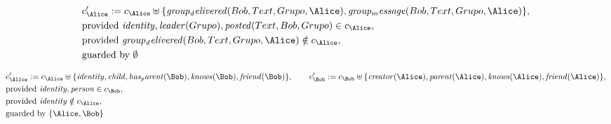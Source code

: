 \begin{align*}
&
c'_
{
\Alice
}
 := 
c_
{
\Alice
}
 \uplus 
\{
\mathit{
group_delivered
}
(
Bob
,
Text
,
Grupo
,
\Alice
)
,
\mathit{
group_message
}
(
Bob
,
Text
,
Grupo
,
\Alice
)
\}
,\\
&
\text{provided } 
\mathit{
identity
}
,
\mathit{
leader
}
(
Grupo
)
,
\mathit{
posted
}
(
Text
,
Bob
,
Grupo
)
 \in c_
{
\Alice
}
,\\
&
\text{provided } 
\mathit{
group_delivered
}
(
Bob
,
Text
,
Grupo
,
\Alice
)
 \notin c_
{
\Alice
}
,\\
&
\text{guarded by } \emptyset
\end{align*}

\begin{align*}
&
c'_
{
\Alice
}
 := 
c_
{
\Alice
}
 \uplus 
\{
\mathit{
identity
}
,
\mathit{
child
}
,
\mathit{
has_parent
}
(
\Bob
)
,
\mathit{
knows
}
(
\Bob
)
,
\mathit{
friend
}
(
\Bob
)
\}
, \qquad 
c'_
{
\Bob
}
 := 
c_
{
\Bob
}
 \uplus 
\{
\mathit{
creator
}
(
\Alice
)
,
\mathit{
parent
}
(
\Alice
)
,
\mathit{
knows
}
(
\Alice
)
,
\mathit{
friend
}
(
\Alice
)
\}
,\\
&
\text{provided } 
\mathit{
identity
}
,
\mathit{
person
}
 \in c_
{
\Bob
}
,\\
&
\text{provided } 
\mathit{
identity
}
 \notin c_
{
\Alice
}
,\\
&
\text{guarded by } \{
\Alice
,
\Bob
\}
\end{align*}

